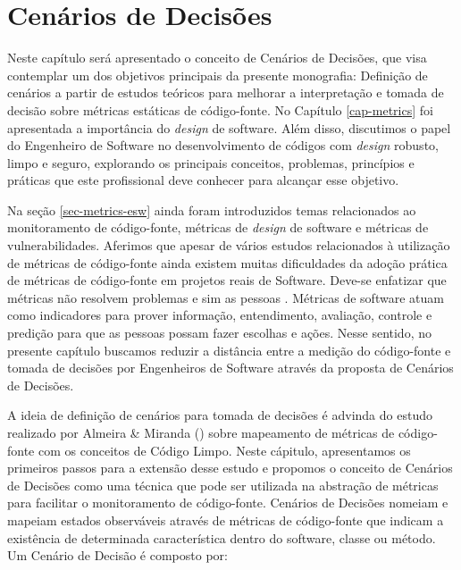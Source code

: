 \chapter{Cenários de Decisões}
\label{cap-cenarios}

Neste capítulo será apresentado o conceito de Cenários de Decisões, que visa contemplar um dos objetivos principais da presente monografia: Definição de cenários a partir de estudos teóricos para melhorar a interpretação e tomada de decisão sobre métricas estáticas de código-fonte. No Capítulo \ref{cap-metrics} foi apresentada a importância do \emph{design} de software. Além disso, discutimos o papel do Engenheiro de Software no desenvolvimento de códigos com \emph{design} robusto, limpo e seguro, explorando os principais conceitos, problemas, princípios e práticas que este profissional deve conhecer para alcançar esse objetivo. 

Na seção \ref{sec-metrics-esw} ainda foram introduzidos temas relacionados ao monitoramento de código-fonte, métricas de \emph{design} de software e métricas de vulnerabilidades. Aferimos que apesar de vários estudos relacionados à utilização de métricas de código-fonte ainda existem muitas dificuldades da adoção prática de métricas de código-fonte em projetos reais de Software. Deve-se enfatizar que métricas não resolvem problemas e sim as pessoas \cite{westfall2005}. Métricas de software atuam como indicadores para prover informação, entendimento, avaliação, controle e predição para que as pessoas possam fazer escolhas e ações. Nesse sentido, no presente capítulo buscamos reduzir a distância entre a medição do código-fonte e tomada de decisões por Engenheiros de Software através da proposta de Cenários de Decisões.

A ideia de definição de cenários para tomada de decisões é advinda do estudo realizado por Almeira \& Miranda (\citeyear{almeida2010}) sobre mapeamento de métricas de código-fonte com os conceitos de Código Limpo. Neste cápitulo, apresentamos os primeiros passos para a extensão desse estudo e propomos o conceito de Cenários de Decisões como uma técnica que pode ser utilizada na abstração de métricas para facilitar o monitoramento de código-fonte. Cenários de Decisões nomeiam e mapeiam estados observáveis através de métricas de código-fonte que indicam a existência de determinada característica dentro do software, classe ou método. Um Cenário de Decisão é composto por:

